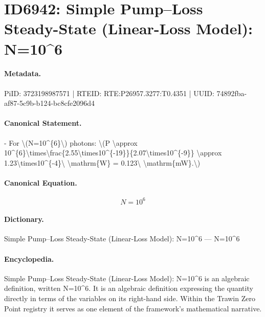 \section*{ID6942: Simple Pump–Loss Steady-State (Linear-Loss Model): N=10\textasciicircum{}6}
\paragraph{Metadata.}
PiID: 3723198987571 | RTEID: RTE:P26957.3277:T0.4351 | UUID: 74892fba-af87-5c9b-b124-bc8cfe2096d4

\paragraph{Canonical Statement.}
- For \textbackslash{}(N=10\textasciicircum{}\{6\}\textbackslash{}) photons: \textbackslash{}(P \textbackslash{}approx 10\textasciicircum{}\{6\}\textbackslash{}times\textbackslash{}frac\{2.55\textbackslash{}times10\textasciicircum{}\{-19\}\}\{2.07\textbackslash{}times10\textasciicircum{}\{-9\}\} \textbackslash{}approx 1.23\textbackslash{}times10\textasciicircum{}\{-4\}\textbackslash{} \textbackslash{}mathrm\{W\} = 0.123\textbackslash{} \textbackslash{}mathrm\{mW\}.\textbackslash{})

\paragraph{Canonical Equation.}
\[
N=10^{6}
\]

\paragraph{Dictionary.}
Simple Pump–Loss Steady-State (Linear-Loss Model): N=10\textasciicircum{}6 — N=10\textasciicircum{}6

\paragraph{Encyclopedia.}
Simple Pump–Loss Steady-State (Linear-Loss Model): N=10\textasciicircum{}6 is an algebraic definition, written N=10\textasciicircum{}6. It is an algebraic definition expressing the quantity directly in terms of the variables on its right-hand side. Within the Trawin Zero Point registry it serves as one element of the framework's mathematical narrative.
